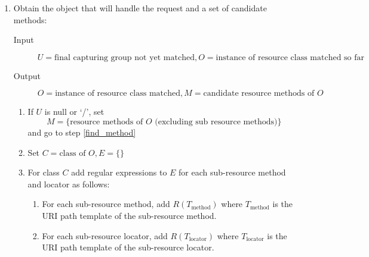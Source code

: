 \begin{enumerate}
\begin{enumerate}
\item Sort $E$ using the number of literal characters\footnote{Here, literal characters means those not resulting from template variable substitution.} in each member as the primary key (descending order), the number of capturing groups as a secondary key (descending order) and the number of capturing groups with non-default regular expressions (i.e. not \lq([\^{ }/]+?)\rq) as the tertiary key (descending order).

\item Set $R_{\mbox{match}}$ to be the first member of $E$, set $U$ to be the value of the final capturing group of $R_{\mbox{match}}$ when matched against $U$, and instantiate an object $O$ of the associated class.

\end{enumerate}

\item \label{find_object} Obtain the object that will handle the request and a set of candidate methods:

\begin{description}
\item[Input]   $U=\mbox{final capturing group not yet matched}, O=\mbox{instance of resource class matched so far}$
\item[Output] $O=\mbox{instance of resource class matched}, M=\mbox{candidate resource methods of $O$}$
\end{description}

\begin{enumerate}
\item \label{check_null} If $U$ is null or \lq/\rq, set
$$M = \{\mbox{resource methods of } O \mbox{ (excluding sub resource methods)}\}$$
and go to step \ref{find_method}

\item Set $C=\mbox{class of } O, E=\{\}$

\item For class $C$ add regular expressions to $E$ for each sub-resource method and locator as follows:
\begin{enumerate}
\item \label{t_method_items} For each sub-resource method, add $R(T_{\mbox{method}})$ where $T_{\mbox{method}}$ is the URI path template of the sub-resource method.
\item For each sub-resource locator, add $R(T_{\mbox{locator}})$ where $T_{\mbox{locator}}$ is the  URI path template of the sub-resource locator.
\end{enumerate}


\end{enumerate}
\end{enumerate}
